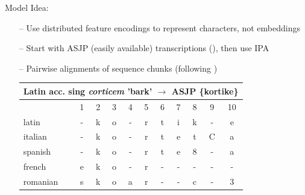 \documentclass[11pt]{beamer}
\begin{document}
\begin{frame}{Model}
    Idea:
    \begin{itemize}
        \item[--] Use distributed feature encodings to represent characters, not embeddings
        \item[--] Start with ASJP (easily available) transcriptions (\cite{brown_automated_2008}), then use IPA
        \item[--] Pairwise alignments of sequence chunks (following \cite{ciobanu_ab_2018}) \\
        \begin{center}
        \begin{tabular}{lcccccccccc}
            \hline
            \multicolumn{11}{c}{Latin acc. sing \textit{corticem} 'bark' $\rightarrow$ ASJP \{kortike\}} \\
            \hline
            & 1 & 2 & 3 & 4 & 5 & 6 & 7 & 8 & 9 & 10 \\
            latin & - & k & o & - & r & t & i & k & - & e \\
            italian & - & k & o & - & r & t & e & t & C & a \\
            spanish & - & k & o & - & r & t & e & 8 & - & a \\
            french & e & k & o & - & r & - & - & - & - & - \\
            romanian & s & k & o & a & r & - & - & c & - & 3  
        \end{tabular}
        \end{center}
    \end{itemize}
\end{frame}
\end{document}
